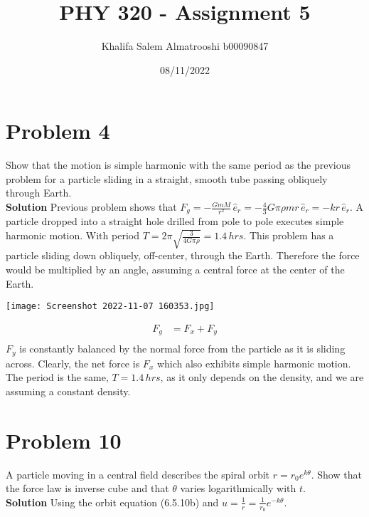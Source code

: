 \documentclass[]{article}
\title{PHY 320 - Assignment 5}
\author{Khalifa Salem Almatrooshi b00090847}
\date{08/11/2022}
\newcommand{\bd}{\textbf}
\begin{document}
	
	\maketitle
	
	\section{Problem 4}
	
	Show that the motion is simple harmonic with the same period as the previous problem for a particle sliding in a straight, smooth tube passing obliquely through Earth. \\
	
	\bd{Solution} Previous problem shows that $ F_g = -\frac{GmM}{r^2} \, \hat{e}_r = -\frac{4}{3}G\pi\rho mr \, \hat{e}_r = -kr \, \hat{e}_r $. A particle dropped into a straight hole drilled from pole to pole executes simple harmonic motion. With period $ T = 2\pi \sqrt{\frac{3}{4G\pi\rho}} = 1.4 \, hrs $. This problem has a particle sliding down obliquely, off-center, through the Earth. Therefore the force would be multiplied by an angle, assuming a central force at the center of the Earth.
	\begin{center}
		\texttt{[image: Screenshot 2022-11-07 160353.jpg]}
	\end{center}
	\begin{equation}
		\begin{split}
			F_g &= F_x + F_y  \\
		\end{split}
	\end{equation}
	$ F_y $ is constantly balanced by the normal force from the particle as it is sliding across. Clearly, the net force is $ F_x $ which also exhibits simple harmonic motion. The period is the same, $ T = 1.4 \, hrs $, as it only depends on the density, and we are assuming a constant density.
	
	\section{Problem 10}
	
	A particle moving in a central field describes the spiral orbit $ r = r_0 e^{k \theta} $. Show that the force law is inverse cube and that $ \theta $ varies logarithmically with $ t $. \\
	
	\bd{Solution} Using the orbit equation (6.5.10b) and $ u = \frac{1}{r} = \frac{1}{r_0} e^{-k\theta} $.
	
\end{document}
